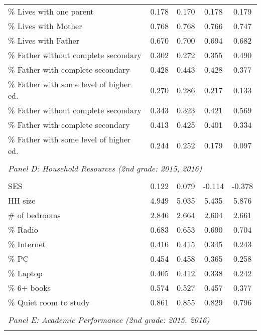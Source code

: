 {\begin{tabular}{lcccc}
\% Lives with one parent&       0.178&       0.170&       0.178&       0.179\\
\% Lives with Mother&       0.768&       0.768&       0.766&       0.747\\
\% Lives with Father&       0.670&       0.700&       0.694&       0.682\\
\% Father without complete secondary&       0.302&       0.272&       0.355&       0.490\\
\% Father with complete secondary&       0.428&       0.443&       0.428&       0.377\\
\% Father with some level of higher ed.&       0.270&       0.286&       0.217&       0.133\\
\% Father without complete secondary&       0.343&       0.323&       0.421&       0.569\\
\% Father with complete secondary&       0.413&       0.425&       0.401&       0.334\\
\% Father with some level of higher ed.&       0.244&       0.252&       0.179&       0.097\\
&  &  &   \\
\multicolumn{4}{l}{\textit{Panel D: Household Resources (2nd grade: 2015, 2016)}} \\
            &            &            &            &            \\
SES         &       0.122&       0.079&      -0.114&      -0.378\\
HH size     &       4.949&       5.035&       5.435&       5.876\\
\# of bedrooms&       2.846&       2.664&       2.604&       2.661\\
\% Radio    &       0.683&       0.653&       0.690&       0.704\\
\% Internet &       0.416&       0.415&       0.345&       0.243\\
\% PC       &       0.454&       0.458&       0.365&       0.258\\
\% Laptop   &       0.405&       0.412&       0.338&       0.242\\
\% 6+ books &       0.574&       0.527&       0.457&       0.377\\
\% Quiet room to study&       0.861&       0.855&       0.829&       0.796\\
&  &  &   \\
\multicolumn{4}{l}{\textit{Panel E: Academic Performance (2nd grade: 2015, 2016)}} \\
            &            &            &            &            \\

\end{tabular}}
